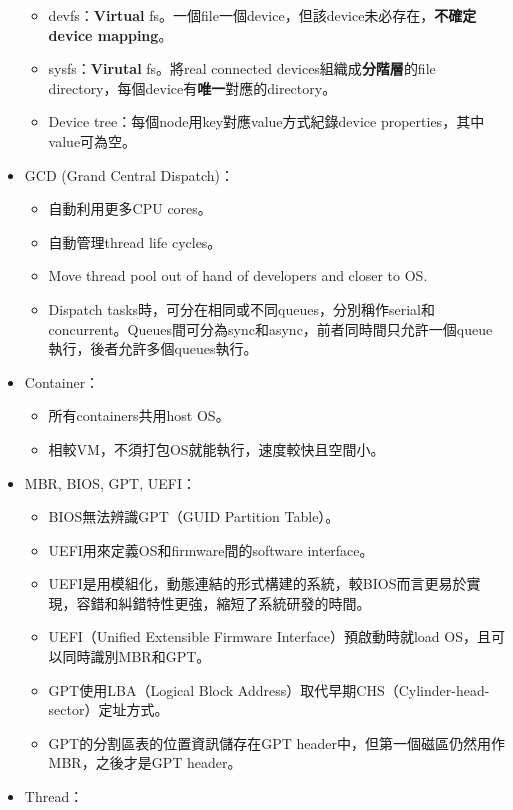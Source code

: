 \begin{itemize}
\begin{itemize}
        \item devfs：\textbf{Virtual} fs。一個file一個device，但該device未必存在，\textbf{不確定device mapping}。
        \item sysfs：\textbf{Virutal} fs。將real connected devices組織成\textbf{分階層}的file directory，每個device有\textbf{唯一}對應的directory。
        \item Device tree：每個node用key對應value方式紀錄device properties，其中value可為空。
    \end{itemize}
    \item GCD (Grand Central Dispatch)： \begin{itemize}
        \item 自動利用更多CPU cores。
        \item 自動管理thread life cycles。
        \item Move thread pool out of hand of developers and closer to OS.
        \item Dispatch tasks時，可分在相同或不同queues，分別稱作serial和concurrent。Queues間可分為sync和async，前者同時間只允許一個queue執行，後者允許多個queues執行。
    \end{itemize}
    \item Container： \begin{itemize}
        \item 所有containers共用host OS。
        \item 相較VM，不須打包OS就能執行，速度較快且空間小。
    \end{itemize}
    \item MBR, BIOS, GPT, UEFI： \begin{itemize}
        \item BIOS無法辨識GPT（GUID Partition Table）。
        \item UEFI用來定義OS和firmware間的software interface。
        \item UEFI是用模組化，動態連結的形式構建的系統，較BIOS而言更易於實現，容錯和糾錯特性更強，縮短了系統研發的時間。
        \item UEFI（Unified Extensible Firmware Interface）預啟動時就load OS，且可以同時識別MBR和GPT。
        \item GPT使用LBA（Logical Block Address）取代早期CHS（Cylinder-head-sector）定址方式。
        \item GPT的分割區表的位置資訊儲存在GPT header中，但第一個磁區仍然用作MBR，之後才是GPT header。
    \end{itemize}
    \item Thread： \begin{itemize}

\end{itemize}
\end{itemize}
